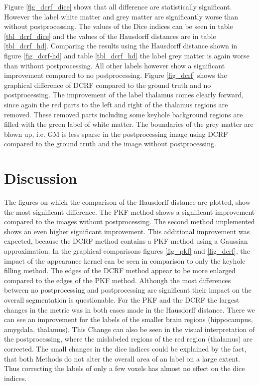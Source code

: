 \documentclass[journal]{IEEEtran}
\begin{document}
Figure \ref{fig_dcrf_dice} shows that all difference are statistically significant. However the label white matter and grey matter are significantly worse than without postprocessing.
The values of the Dice indices can be seen in table \ref{tbl_dcrf_dice} and the values of the Hausdorff distances are in table \ref{tbl_dcrf_hd}.
Comparing the results using the Hausdorff distance shown in figure \ref{fig_dcrf-hd} and table \ref{tbl_dcrf_hd} the label grey matter is again worse than without postprocessing. All other labels however show a significant improvement compared to no postprocessing. 
Figure \ref{fig_dcrf} shows the graphical difference of DCRF compared to the ground truth and no postprocessing. The improvement of the label thalamus comes clearly forward, since again the red parts to the left and right of the thalamus regions are removed. These removed parts including some keyhole background regions are filled with the green label of white matter. 
The boundaries of the grey matter are blown up, i.e. GM is less sparse in the postprocessing image using DCRF compared to the ground truth and the image without postprocessing.


\section{Discussion}
The figures on which the comparison of the Hausdorff distance are plotted, show the most significant difference. The PKF method shows a significant improvement compared to the images without postprocessing. The second method implemented shows an even higher significant improvement. This additional improvement was expected, because the DCRF method contains a PKF method using a Gaussian approximation. In the graphical comparisons figures \ref{fig_pkf} and \ref{fig_dcrf}, the impact of the appearance kernel can be seen in comparison to only the keyhole filling method. The edges of the DCRF method appear to be more enlarged compared to the edges of the PKF method.
Although the most differences between no postprocessing and postprocessing are significant their impact on the overall segmentation is questionable. For the PKF and the DCRF the largest changes in the metric was in both cases made in the Hausdorff distance. There we can see an improvement for the labels of the smaller brain regions (hippocampus, amygdala, thalamus). This Change can also be seen in the visual interpretation of the postprocessing, where the mislabeled regions of the red region (thalamus) are corrected. The small changes in the dice indices could be explained by the fact, that both Methods do not alter the overall area of an label on a large extent. Thus correcting the labels of only a few voxels has almost no effect on the dice indices.
\end{document}
